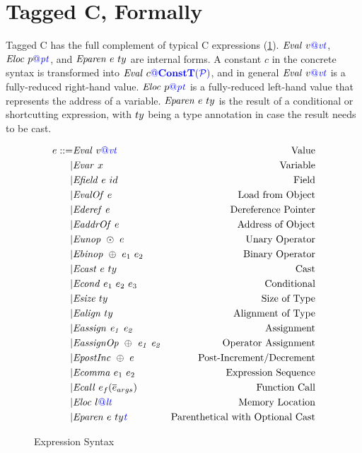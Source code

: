 \documentclass{llncs}
\begin{document}



\section{Tagged C, Formally}

Tagged C has the full complement of typical C expressions (\cref{fig:expr}). \(\mathit{Eval} ~ v{\color{blue} @}\mathit{\color{blue} vt}\),
\(\mathit{Eloc} ~ p{\color{blue} @}\mathit{\color{blue} pt}\), and \(\mathit{Eparen} ~ e ~ ty\) are internal forms.
A constant \(c\) in the concrete syntax is transformed into \(\mathit{Eval} ~ c{\color{blue} @}\color{blue} \mathbf{ConstT}(\mathcal{\color{blue} P\mathit{}})\),
and in general \(\mathit{Eval} ~ v{\color{blue} @}\mathit{\color{blue} vt}\) is a fully-reduced right-hand value. \(\mathit{Eloc} ~ p{\color{blue} @}\mathit{\color{blue} pt}\)
is a fully-reduced left-hand value that represents the address of a variable.
\(\mathit{Eparen} ~ e ~ ty\) is the result of a conditional or shortcutting
expression, with \(ty\) being a type annotation in case the result needs to
be cast.

\begin{figure}
  \[\begin{aligned}
  e ::= & \mathit{Eval} ~ v{\color{blue} @}\mathit{\color{blue} vt} & \textnormal{Value} \\
  | & \mathit{Evar} ~ x & \textnormal{Variable} \\
  | & \mathit{Efield} ~ e ~ id & \textnormal{Field} \\
  | & \mathit{EvalOf} ~ e & \textnormal{Load from Object} \\
  | & \mathit{Ederef} ~ e & \textnormal{Dereference Pointer} \\
  | & \mathit{EaddrOf} ~ e & \textnormal{Address of Object} \\
  | & \mathit{Eunop} ~ \odot ~ e & \textnormal{Unary Operator} \\
  | & \mathit{Ebinop} ~ \oplus ~ e_1 ~ e_2 & \textnormal{Binary Operator} \\
  | & \mathit{Ecast} ~ e ~ ty & \textnormal{Cast} \\
  | & \mathit{Econd} ~ e_1 ~ e_2 ~ e_3 & \textnormal{Conditional} \\
  | & \mathit{Esize} ~ ty & \textnormal{Size of Type} \\
  | & \mathit{Ealign} ~ ty & \textnormal{Alignment of Type} \\
  | & \mathit{Eassign ~ e_1 ~ e_2} & \textnormal{Assignment} \\
  | & \mathit{EassignOp ~ \oplus ~ e_1 ~ e_2} & \textnormal{Operator Assignment} \\
  | & \mathit{EpostInc} ~ \oplus ~ e & \textnormal{Post-Increment/Decrement} \\
  | & \mathit{Ecomma} ~ e_1 ~ e_2 & \textnormal{Expression Sequence} \\
  | & \mathit{Ecall} ~ e_f(\overline{e}_{args}) & \textnormal{Function Call} \\
  | & \mathit{Eloc} ~ l{\color{blue} @}\mathit{\color{blue} lt} & \textnormal{Memory Location} \\
  | & \mathit{Eparen} ~ e ~ ty{\mathit{\color{blue} t}} & \textnormal{Parenthetical with Optional Cast} \\
  \end{aligned}\]
  \caption{Expression Syntax}
  \label{fig:expr}
\end{figure}
\end{document}
